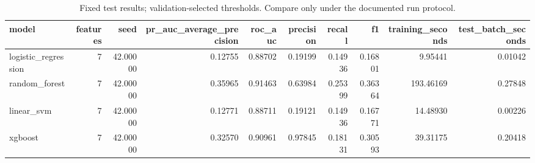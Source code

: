 \begin{table}
\caption{Fixed test results; validation-selected thresholds. Compare only under the documented run protocol.}
\begin{tabular}{lrrrrrrrrr}
\toprule
model & features & seed & pr\_auc\_average\_precision & roc\_auc & precision & recall & f1 & training\_seconds & test\_batch\_seconds \\
\midrule
logistic\_regression & 7 & 42.00000 & 0.12755 & 0.88702 & 0.19199 & 0.14936 & 0.16801 & 9.95441 & 0.01042 \\
random\_forest & 7 & 42.00000 & 0.35965 & 0.91463 & 0.63984 & 0.25399 & 0.36364 & 193.46169 & 0.27848 \\
linear\_svm & 7 & 42.00000 & 0.12771 & 0.88711 & 0.19121 & 0.14936 & 0.16771 & 14.48930 & 0.00226 \\
xgboost & 7 & 42.00000 & 0.32570 & 0.90961 & 0.97845 & 0.18131 & 0.30593 & 39.31175 & 0.20418 \\
\bottomrule
\end{tabular}
\end{table}
